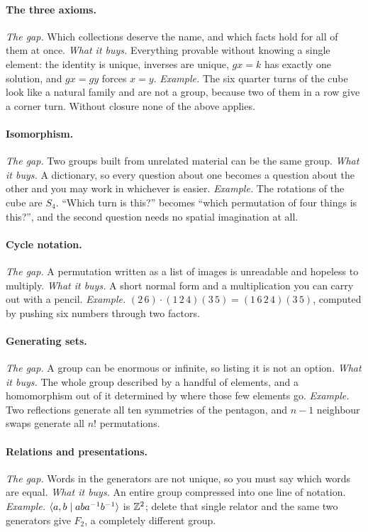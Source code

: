 \paragraph{The three axioms.} \emph{The gap.} Which collections deserve the name, and which facts hold for all of them at once. \emph{What it buys.} Everything provable without knowing a single element: the identity is unique, inverses are unique, $gx=k$ has exactly one solution, and $gx=gy$ forces $x=y$. \emph{Example.} The six quarter turns of the cube look like a natural family and are not a group, because two of them in a row give a corner turn. Without closure none of the above applies.

\paragraph{Isomorphism.} \emph{The gap.} Two groups built from unrelated material can be the same group. \emph{What it buys.} A dictionary, so every question about one becomes a question about the other and you may work in whichever is easier. \emph{Example.} The rotations of the cube are $S_4$. ``Which turn is this?'' becomes ``which permutation of four things is this?'', and the second question needs no spatial imagination at all.

\paragraph{Cycle notation.} \emph{The gap.} A permutation written as a list of images is unreadable and hopeless to multiply. \emph{What it buys.} A short normal form and a multiplication you can carry out with a pencil. \emph{Example.} $(2\,6)\cdot(1\,2\,4)(3\,5)=(1\,6\,2\,4)(3\,5)$, computed by pushing six numbers through two factors.

\paragraph{Generating sets.} \emph{The gap.} A group can be enormous or infinite, so listing it is not an option. \emph{What it buys.} The whole group described by a handful of elements, and a homomorphism out of it determined by where those few elements go. \emph{Example.} Two reflections generate all ten symmetries of the pentagon, and $n-1$ neighbour swaps generate all $n!$ permutations.

\paragraph{Relations and presentations.} \emph{The gap.} Words in the generators are not unique, so you must say which words are equal. \emph{What it buys.} An entire group compressed into one line of notation. \emph{Example.} $\langle a,b\mid aba^{-1} b^{-1}\rangle$ is $\mathbb{Z}^2$; delete that single relator and the same two generators give $F_2$, a completely different group.

